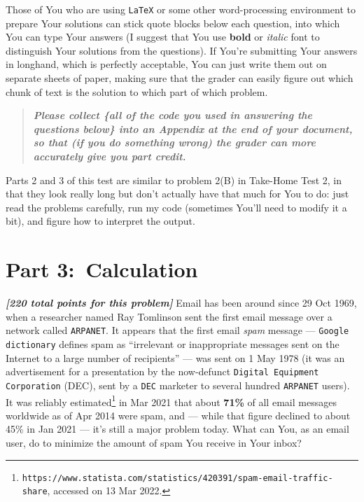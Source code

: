 \documentclass[12pt]{article}
\newcommand{\bi}[1]{\textbf{\textit{#1}}}
\begin{document}
Those of You who are using \texttt{LaTeX} or some other word-processing environment to prepare Your solutions can stick quote blocks below each question, into which You can type Your answers (I suggest that You use \textbf{bold} or \textit{italic} font to distinguish Your solutions from the questions). If You're submitting Your answers in longhand, which is perfectly acceptable, You can just write them out on separate sheets of paper, making sure that the grader can easily figure out which chunk of text is the solution to which part of which problem.
\begin{quote}

\bi{Please collect \{all of the code you used in answering the questions  below\} into an Appendix at the end of your document, so that (if you do something wrong) the grader can more accurately give you part credit.} 

\end{quote}

Parts 2 and 3 of this test are similar to problem 2(B) in Take-Home Test 2, in that they look really long but don't actually have that much for You to do: just read the problems carefully, run my code (sometimes You'll need to modify it a bit), and figure how to interpret the output.

\section*{Part 3:~Calculation}

\bi{[220 total points for this problem]} Email has been around since 29 Oct 1969, when a researcher named Ray Tomlinson sent the first email message over a network called \texttt{ARPANET}. It appears that the first email \textit{spam} message --- \texttt{Google dictionary} defines spam as ``irrelevant or inappropriate messages sent on the Internet to a large number of recipients'' --- was sent on 1 May 1978 (it was an advertisement for a presentation by the now-defunct \texttt{Digital Equipment Corporation} (DEC), sent by a \texttt{DEC} marketer to several hundred \texttt{ARPANET} users). It was reliably estimated\footnote{\texttt{https://www.statista.com/statistics/420391/spam-email-traffic-share}, accessed on 13 Mar 2022.} in Mar 2021 that about \textbf{71\%} of all email messages worldwide as of Apr 2014 were spam, and --- while that figure declined to about 45\% in Jan 2021 --- it's still a major problem today. What can You, as an email user, do to minimize the amount of spam You receive in Your inbox?
\end{document}
